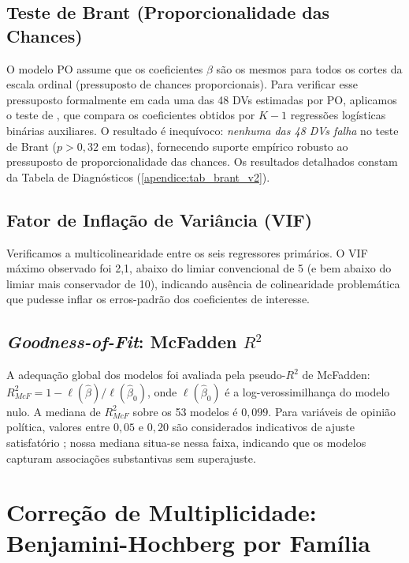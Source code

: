 \subsection{Teste de Brant (Proporcionalidade das Chances)}

O modelo PO assume que os coeficientes $\beta$ são os mesmos para todos os cortes da escala ordinal (pressuposto de chances proporcionais). Para verificar esse pressuposto formalmente em cada uma das 48 DVs estimadas por PO, aplicamos o teste de , que compara os coeficientes obtidos por $K-1$ regressões logísticas binárias auxiliares. O resultado é inequívoco: \textit{nenhuma das 48 DVs falha} no teste de Brant ($p > 0{,}32$ em todas), fornecendo suporte empírico robusto ao pressuposto de proporcionalidade das chances. Os resultados detalhados constam da Tabela de Diagnósticos (\autoref{apendice:tab_brant_v2}).

\subsection{Fator de Inflação de Variância (VIF)}

Verificamos a multicolinearidade entre os seis regressores primários. O VIF máximo observado foi 2{,}1, abaixo do limiar convencional de 5 (e bem abaixo do limiar mais conservador de 10), indicando ausência de colinearidade problemática que pudesse inflar os erros-padrão dos coeficientes de interesse.

\subsection{\textit{Goodness-of-Fit}: McFadden $R^2$}

A adequação global dos modelos foi avaliada pela pseudo-$R^2$ de McFadden:
$R^2_{McF} = 1 - \ell(\hat{\beta})/\ell(\hat{\beta}_0)$,
onde $\ell(\hat{\beta}_0)$ é a log-verossimilhança do modelo nulo. A mediana de $R^2_{McF}$ sobre os 53 modelos é $0{,}099$. Para variáveis de opinião política, valores entre $0{,}05$ e $0{,}20$ são considerados indicativos de ajuste satisfatório \cite{mccullaghNelder1989}; nossa mediana situa-se nessa faixa, indicando que os modelos capturam associações substantivas sem superajuste.

\section{Correção de Multiplicidade: Benjamini-Hochberg por Família}\label{sec:fdr_bh}

